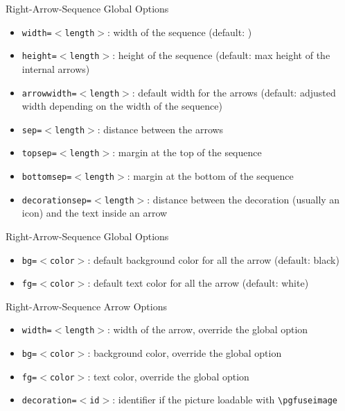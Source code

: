 \documentclass[english,sectioncirclenumberstyle]{ciadbeamer}
\begin{document}
\begin{frame}{{Right-Arrow-Sequence} Global Options}
	\begin{itemize}
	\item \texttt{width=\ensuremath{<}length\ensuremath{>}}: width of the sequence (default: \the\linewidth)
	\item \texttt{height=\ensuremath{<}length\ensuremath{>}}: height of the sequence (default: max height of the internal arrows)
	\item \texttt{arrowwidth=\ensuremath{<}length\ensuremath{>}}: default width for the arrows (default: adjusted width depending on the width of the sequence)
	\item \texttt{sep=\ensuremath{<}length\ensuremath{>}}: distance between the arrows
	\item \texttt{topsep=\ensuremath{<}length\ensuremath{>}}: margin at the top of the sequence
	\item \texttt{bottomsep=\ensuremath{<}length\ensuremath{>}}: margin at the bottom of the sequence
	\item \texttt{decorationsep=\ensuremath{<}length\ensuremath{>}}: distance between the decoration (usually an icon) and the text inside an arrow
	\end{itemize}
\end{frame}

\begin{frame}{{Right-Arrow-Sequence} Global Options \insertcontinuationtext}
	\begin{itemize}
	\item \texttt{bg=\ensuremath{<}color\ensuremath{>}}: default background color for all the arrow (default: black)
	\item \texttt{fg=\ensuremath{<}color\ensuremath{>}}: default text color for all the arrow (default: white)
	\end{itemize}
\end{frame}

\begin{frame}{{Right-Arrow-Sequence} Arrow Options}
	\begin{itemize}
	\item \texttt{width=\ensuremath{<}length\ensuremath{>}}: width of the arrow, override the global option
	\item \texttt{bg=\ensuremath{<}color\ensuremath{>}}: background color, override the global option
	\item \texttt{fg=\ensuremath{<}color\ensuremath{>}}: text color, override the global option
	\item \texttt{decoration=\ensuremath{<}id\ensuremath{>}}: identifier if the picture loadable with \texttt{{\textbackslash}pgfuseimage}
	\end{itemize}
\end{frame}
\end{document}
